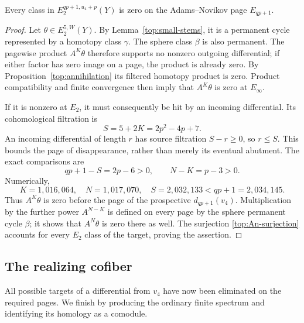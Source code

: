 \begin{proposition}
\label{top:early-disappearance}
Every class in $E_2^{qp+1,u_4+p}(Y)$ is zero on the
Adams--Novikov page $E_{qp+1}$.
\end{proposition}

\begin{proof}
Let $\theta\in E_2^{5,W}(Y)$. By Lemma~\ref{top:small-stems},
it is a permanent cycle represented by a homotopy class $\gamma$.
The sphere class $\beta$ is also permanent. The pagewise product
$A^K\theta$ therefore supports no nonzero outgoing differential;
if either factor has zero image on a page, the product is already
zero. By Proposition~\ref{top:annihilation} its filtered homotopy
product is zero. Product compatibility and finite convergence
then imply that $A^K\theta$ is zero at $E_\infty$.

If it is nonzero at $E_2$, it must consequently be hit by an
incoming differential. Its cohomological filtration is
\[
 S=5+2K=2p^2-4p+7.
\]
An incoming differential of length $r$ has source filtration
$S-r\geq0$, so $r\leq S$. This bounds the page of disappearance,
rather than merely its eventual abutment. The exact comparisons
are
\begin{equation}
\label{top:strict-page-bound}
 qp+1-S=2p-6>0,\qquad N-K=p-3>0.
\end{equation}
Numerically,
\[
 K=1{,}016{,}064,\quad N=1{,}017{,}070,\quad
 S=2{,}032{,}133<qp+1=2{,}034{,}145.
\]
Thus $A^K\theta$ is zero before the page of the prospective
$d_{qp+1}(v_4)$. Multiplication by the further power $A^{N-K}$ is
defined on every page by the sphere permanent cycle $\beta$;
it shows that $A^N\theta$ is zero there as well.
The surjection \eqref{top:An-surjection} accounts for every
$E_2$ class of the target, proving the assertion.
\end{proof}

\subsection{The realizing cofiber}\label{top:main-construction}

All possible targets of a differential from $v_4$ have now been
eliminated on the required pages. We finish by producing the ordinary
finite spectrum and identifying its homology as a comodule.

